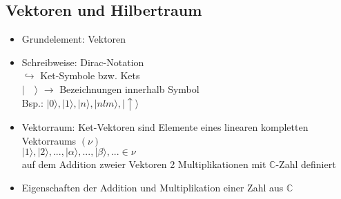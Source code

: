 \documentclass[10pt,article,colorback,accentcolor=tud9d]{scrartcl}
\begin{document}
\subsection{Vektoren und Hilbertraum}
\begin{itemize}
\item Grundelement: Vektoren
\item Schreibweise: Dirac-Notation\\
$\hookrightarrow$ Ket-Symbole bzw. Kets\\
$\left| \quad \rangle  \right.$ $\rightarrow$ Bezeichnungen innerhalb Symbol\\
Bsp.: $\left| 0\rangle \right.,\left|1\rangle \right.,\left|n\rangle \right.,\left|nlm\rangle \right.,
\left| \uparrow\rangle \right.$
\item Vektorraum: Ket-Vektoren sind Elemente eines linearen kompletten 
Vektorraums $(\nu)$\\
$\left|1\rangle \right.,\left|2\rangle \right.,...,\left|\alpha\rangle \right.,...,\left|\beta\rangle 
\right.,... \in \nu$\\
auf dem Addition zweier Vektoren 2 Multiplikationen mit $\mathbb{C}$-Zahl 
definiert
\item Eigenschaften der Addition und Multiplikation einer Zahl aus $\mathbb{C}$
 

\end{itemize}
\end{document}
